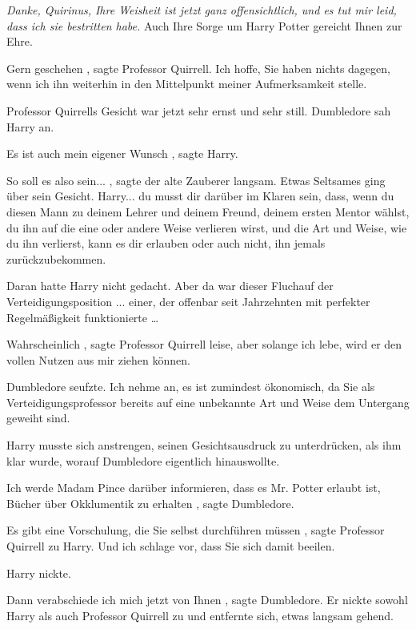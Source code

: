 \glqq \emph{Danke, Quirinus, Ihre Weisheit ist jetzt ganz offensichtlich, und es
tut mir leid, dass ich sie bestritten habe.} Auch Ihre Sorge um Harry Potter
gereicht Ihnen zur Ehre.\grqq{}

\glqq Gern geschehen\grqq{} , sagte Professor Quirrell. \glqq Ich hoffe, Sie
haben nichts dagegen, wenn ich ihn weiterhin in den Mittelpunkt meiner
Aufmerksamkeit stelle.\grqq{}

Professor Quirrells Gesicht war jetzt sehr ernst und sehr still. Dumbledore sah
Harry an.

\glqq Es ist auch mein eigener Wunsch\grqq{} , sagte Harry.

\glqq So soll es also sein...\grqq{} , sagte der alte Zauberer langsam. Etwas
Seltsames ging über sein Gesicht. \glqq Harry... du musst dir darüber im Klaren
sein, dass, wenn du diesen Mann zu deinem Lehrer und deinem Freund, deinem
ersten Mentor wählst, du ihn auf die eine oder andere Weise verlieren wirst, und
die Art und Weise, wie du ihn verlierst, kann es dir erlauben oder auch nicht,
ihn jemals zurückzubekommen.\grqq{}

Daran hatte Harry nicht gedacht. Aber da war dieser Fluchauf der
Verteidigungsposition ... einer, der offenbar seit Jahrzehnten mit perfekter
Regelmäßigkeit funktionierte …

\glqq Wahrscheinlich\grqq{} , sagte Professor Quirrell leise, \glqq aber solange
ich lebe, wird er den vollen Nutzen aus mir ziehen können.\grqq{}

Dumbledore seufzte. \glqq Ich nehme an, es ist zumindest ökonomisch, da Sie als
Verteidigungsprofessor bereits auf eine unbekannte Art und Weise dem Untergang
geweiht sind.\grqq{}

Harry musste sich anstrengen, seinen Gesichtsausdruck zu unterdrücken, als ihm
klar wurde, worauf Dumbledore eigentlich hinauswollte.

\glqq Ich werde Madam Pince darüber informieren, dass es Mr. Potter erlaubt ist,
Bücher über Okklumentik zu erhalten\grqq{} , sagte Dumbledore.

\glqq Es gibt eine Vorschulung, die Sie selbst durchführen müssen\grqq{} , sagte
Professor Quirrell zu Harry. \glqq Und ich schlage vor, dass Sie sich damit
beeilen.\grqq{}

Harry nickte.

\glqq Dann verabschiede ich mich jetzt von Ihnen\grqq{} , sagte Dumbledore. Er
nickte sowohl Harry als auch Professor Quirrell zu und entfernte sich, etwas
langsam gehend.

